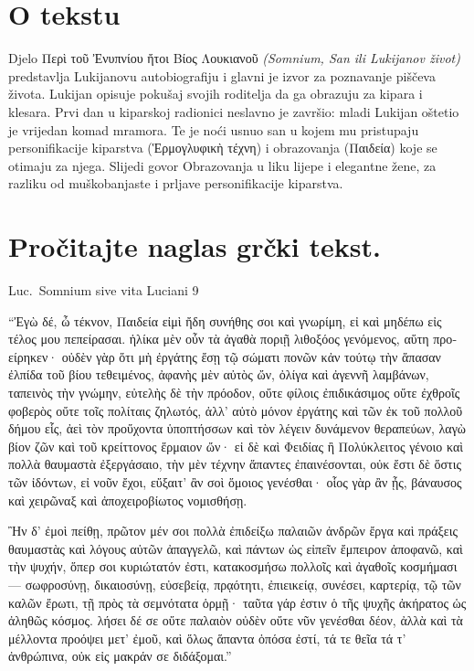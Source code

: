 

\section*{O tekstu}

Djelo \textgreek[variant=ancient]{Περὶ τοῦ Ἐνυπνίου ἤτοι Βίος Λουκιανοῦ} \textit{(Somnium, San ili Lukijanov život)} predstavlja Lukijanovu autobiografiju i glavni je izvor za poznavanje piščeva života. Lukijan opisuje pokušaj svojih roditelja da ga obrazuju za kipara i klesara. Prvi dan u kiparskoj radionici neslavno je završio: mladi Lukijan oštetio je vrijedan komad mramora. Te je noći usnuo san u kojem mu pristupaju personifikacije kiparstva \textgreek[variant=ancient]{(Ἑρμογλυφικὴ τέχνη)} i obrazovanja \textgreek[variant=ancient]{(Παιδεία)} koje se otimaju za njega. Slijedi govor Obrazovanja u liku lijepe i elegantne žene, za razliku od muškobanjaste i prljave personifikacije kiparstva.

\section*{Pročitajte naglas grčki tekst.}

Luc.\ Somnium sive vita Luciani 9


\medskip


{\large
{ 
\begin{greek}

\noindent ``Ἐγὼ δέ, ὦ τέκνον, Παιδεία εἰμὶ ἤδη συνήθης σοι καὶ γνωρίμη, εἰ καὶ μηδέπω εἰς τέλος μου πεπείρασαι. ἡλίκα μὲν οὖν τὰ ἀγαθὰ ποριῇ λιθοξόος γενόμενος, αὕτη προείρηκεν· οὐδὲν γὰρ ὅτι μὴ ἐργάτης ἔσῃ τῷ σώματι πονῶν κἀν τούτῳ τὴν ἅπασαν ἐλπίδα τοῦ βίου τεθειμένος, ἀφανὴς μὲν αὐτὸς ὤν, ὀλίγα καὶ ἀγεννῆ λαμβάνων, ταπεινὸς τὴν γνώμην, εὐτελὴς δὲ τὴν πρόοδον, οὔτε φίλοις ἐπιδικάσιμος οὔτε ἐχθροῖς φοβερὸς οὔτε τοῖς πολίταις ζηλωτός, ἀλλ' αὐτὸ μόνον ἐργάτης καὶ τῶν ἐκ τοῦ πολλοῦ δήμου εἷς, ἀεὶ τὸν προὔχοντα ὑποπτήσσων καὶ τὸν λέγειν δυνάμενον θεραπεύων, λαγὼ βίον ζῶν καὶ τοῦ κρείττονος ἕρμαιον ὤν· εἰ δὲ καὶ Φειδίας ἢ Πολύκλειτος γένοιο καὶ πολλὰ θαυμαστὰ ἐξεργάσαιο, τὴν μὲν τέχνην ἅπαντες ἐπαινέσονται, οὐκ ἔστι δὲ ὅστις τῶν ἰδόντων, εἰ νοῦν ἔχοι, εὔξαιτ' ἂν σοὶ ὅμοιος γενέσθαι· οἷος γὰρ ἂν ᾖς, βάναυσος καὶ χειρῶναξ καὶ ἀποχειροβίωτος νομισθήσῃ.

Ἢν δ' ἐμοὶ πείθῃ, πρῶτον μέν σοι πολλὰ ἐπιδείξω παλαιῶν ἀνδρῶν ἔργα καὶ πράξεις θαυμαστὰς καὶ λόγους αὐτῶν ἀπαγγελῶ, καὶ πάντων ὡς εἰπεῖν ἔμπειρον ἀποφανῶ, καὶ τὴν ψυχήν, ὅπερ σοι κυριώτατόν ἐστι, κατακοσμήσω πολλοῖς καὶ ἀγαθοῖς κοσμήμασι — σωφροσύνῃ, δικαιοσύνῃ, εὐσεβείᾳ, πρᾳότητι, ἐπιεικείᾳ, συνέσει, καρτερίᾳ, τῷ τῶν καλῶν ἔρωτι, τῇ πρὸς τὰ σεμνότατα ὁρμῇ· ταῦτα γάρ ἐστιν ὁ τῆς ψυχῆς ἀκήρατος ὡς ἀληθῶς κόσμος. λήσει δέ σε οὔτε παλαιὸν οὐδὲν οὔτε νῦν γενέσθαι δέον, ἀλλὰ καὶ τὰ μέλλοντα προόψει μετ' ἐμοῦ, καὶ ὅλως ἅπαντα ὁπόσα ἐστί, τά τε θεῖα τά τ' ἀνθρώπινα, οὐκ εἰς μακράν σε διδάξομαι.''


\end{greek}


}
}
